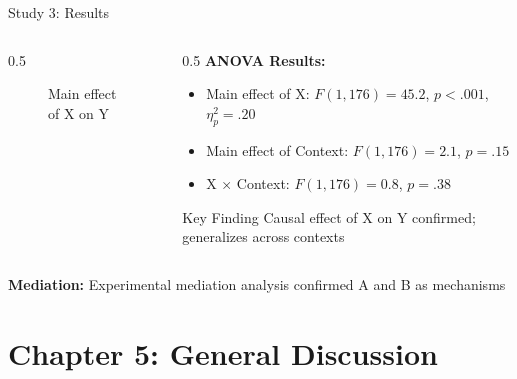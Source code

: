 \documentclass[aspectratio=169,12pt]{beamer}
\begin{document}
\begin{frame}{Study 3: Results}
  \begin{columns}[T]

    \begin{column}{0.5\textwidth}
      \begin{figure}
        \centering
        \caption{Main effect of X on Y}
      \end{figure}
    \end{column}

    \begin{column}{0.5\textwidth}
      \textbf{ANOVA Results:}
      \begin{itemize}
        \item Main effect of X: $F(1,176) = 45.2$, $p < .001$, $\eta^2_p = .20$
        \item Main effect of Context: $F(1,176) = 2.1$, $p = .15$
        \item X × Context: $F(1,176) = 0.8$, $p = .38$
      \end{itemize}

      \vspace{0.5cm}

      \begin{block}{Key Finding}
        Causal effect of X on Y confirmed; generalizes across contexts
      \end{block}
    \end{column}

  \end{columns}

  \vspace{0.5cm}

  \textbf{Mediation:} Experimental mediation analysis confirmed A and B as mechanisms
\end{frame}


\section{Chapter 5: General Discussion}
\end{document}
